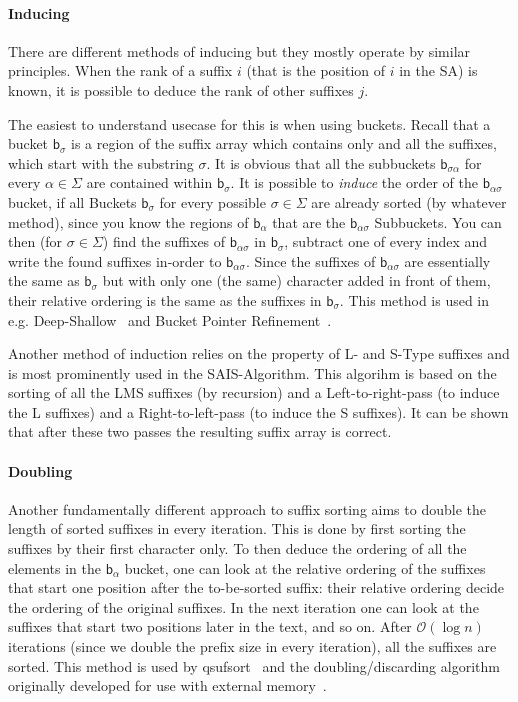 \paragraph{Inducing} %
There are different methods of inducing but they mostly operate by similar principles.
When the rank of a suffix $i$ (that is the position of $i$ in the SA) is known,
it is possible to deduce the rank of other suffixes $j$.

The easiest to understand usecase for this is when using buckets.
Recall that a bucket $\mathsf b_{\sigma}$ is a region of the suffix
array which contains only and all the suffixes,
which start with the substring $\sigma$.
It is obvious that all the subbuckets $\mathsf b_{\sigma\alpha}$ for
every $\alpha \in \Sigma$ are contained within $\mathsf b_\sigma$.
It is possible to \emph{induce} the order of the $\mathsf b_{\alpha\sigma}$ bucket,
if all Buckets $\mathsf b_\sigma$ for every possible $\sigma \in \Sigma$ are already sorted (by whatever method),
since you know the regions of $\mathsf b_\alpha$ that are the $\mathsf b_{\alpha\sigma}$ Subbuckets.
You can then (for $\sigma \in \Sigma$) find the suffixes of $\mathsf b_{\alpha\sigma}$ in $\mathsf b_{\sigma}$,
subtract one of every index and write the found suffixes in-order to $\mathsf b_{\alpha\sigma}$.
Since the suffixes of $\mathsf b_{\alpha\sigma}$ are essentially the same as $\mathsf b_\sigma$ but
with only one (the same) character added in front of them,
their relative ordering is the same as the suffixes in $\mathsf b_\sigma$.
This method is used in e.g. Deep-Shallow~\cite{saca:4} and 
Bucket Pointer Refinement~\cite{saca:2}.

Another method of induction relies on the property of L- and S-Type suffixes and
is most prominently used in the SAIS-Algorithm.
This algorihm is based on the sorting of all the LMS suffixes (by recursion)
and a Left-to-right-pass (to induce the L suffixes)
and a Right-to-left-pass (to induce the S suffixes).
It can be shown that after these two passes the resulting suffix array is correct.

\paragraph{Doubling} Another fundamentally different approach to suffix sorting
aims to double the length of sorted suffixes in every iteration.
This is done by first sorting the suffixes by their first character only.
To then deduce the ordering of all the elements in the $\mathsf b_\alpha$ bucket,
one can look at the relative ordering of the suffixes that start one position
after the to-be-sorted suffix:
their relative ordering decide the ordering of the original suffixes.
In the next iteration one can look at the suffixes that start two positions later in the text,
and so on.
After $\mathcal O(\log n)$ iterations (since we double the prefix size in every iteration),
all the suffixes are sorted.
This method is used by qsufsort~\cite{unknown} and the
doubling/discarding algorithm originally developed for use with external memory~\cite{saca:11}.

